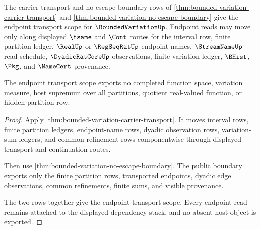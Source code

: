 \begin{theorem}
\label{thm:bounded-variation-endpoint-transport-scope}
The carrier transport and no-escape boundary rows of \autoref{thm:bounded-variation-carrier-transport} and \autoref{thm:bounded-variation-no-escape-boundary} give the endpoint transport scope for $\BoundedVariationUp$. Endpoint reads may move only along displayed $\hsame$ and $\Cont$ routes for the interval row, finite partition ledger, $\RealUp$ or $\RegSeqRatUp$ endpoint names, $\StreamNameUp$ read schedule, $\DyadicRatCoreUp$ observations, finite variation ledger, $\BHist$, $\Pkg$, and $\NameCert$ provenance.

The endpoint transport scope exports no completed function space, variation measure, host supremum over all partitions, quotient real-valued function, or hidden partition row.
\end{theorem}
\begin{proof}
Apply \autoref{thm:bounded-variation-carrier-transport}. It moves interval rows, finite partition ledgers, endpoint-name rows, dyadic observation rows, variation-sum ledgers, and common-refinement rows componentwise through displayed transport and continuation routes.

Then use \autoref{thm:bounded-variation-no-escape-boundary}. The public boundary exports only the finite partition rows, transported endpoints, dyadic edge observations, common refinements, finite sums, and visible provenance.

The two rows together give the endpoint transport scope. Every endpoint read remains attached to the displayed dependency stack, and no absent host object is exported.
\end{proof}

